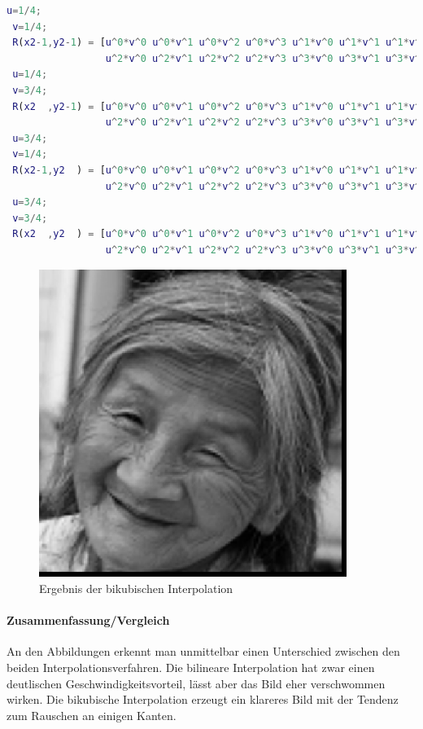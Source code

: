 \begin{lstlisting}[language=matlab,caption=Eigentliche Berechnung der interolierten Werte]
 u=1/4;
 v=1/4;
 R(x2-1,y2-1) = [u^0*v^0 u^0*v^1 u^0*v^2 u^0*v^3 u^1*v^0 u^1*v^1 u^1*v^2 u^1*v^3 ...
                 u^2*v^0 u^2*v^1 u^2*v^2 u^2*v^3 u^3*v^0 u^3*v^1 u^3*v^2 u^3*v^3 ] * a;
 u=1/4;
 v=3/4;
 R(x2  ,y2-1) = [u^0*v^0 u^0*v^1 u^0*v^2 u^0*v^3 u^1*v^0 u^1*v^1 u^1*v^2 u^1*v^3 ...
                 u^2*v^0 u^2*v^1 u^2*v^2 u^2*v^3 u^3*v^0 u^3*v^1 u^3*v^2 u^3*v^3 ] * a;
 u=3/4;
 v=1/4;
 R(x2-1,y2  ) = [u^0*v^0 u^0*v^1 u^0*v^2 u^0*v^3 u^1*v^0 u^1*v^1 u^1*v^2 u^1*v^3 ...
                 u^2*v^0 u^2*v^1 u^2*v^2 u^2*v^3 u^3*v^0 u^3*v^1 u^3*v^2 u^3*v^3 ] * a;
 u=3/4;
 v=3/4;
 R(x2  ,y2  ) = [u^0*v^0 u^0*v^1 u^0*v^2 u^0*v^3 u^1*v^0 u^1*v^1 u^1*v^2 u^1*v^3... 
                 u^2*v^0 u^2*v^1 u^2*v^2 u^2*v^3 u^3*v^0 u^3*v^1 u^3*v^2 u^3*v^3 ] * a;
\end{lstlisting}

\begin{figure}[H]
\begin{center}
\includegraphics[width=100mm]{u07/task2.eps}
\end{center}
\caption{Ergebnis der bikubischen Interpolation}
\end{figure}

\paragraph{Zusammenfassung/Vergleich}
An den Abbildungen erkennt man unmittelbar einen Unterschied zwischen den beiden 
Interpolationsverfahren. Die bilineare Interpolation hat zwar einen deutlischen
Geschwindigkeitsvorteil, l\"asst aber das Bild eher verschwommen wirken.
Die bikubische Interpolation erzeugt ein klareres Bild mit der Tendenz zum 
Rauschen an einigen Kanten.


